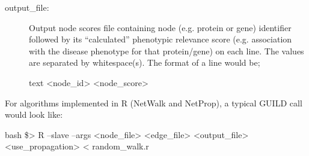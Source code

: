 \documentclass[11pt,twoside]{article}
\newcommand{\printcommand}[1]{\colorbox{code}{\scriptsize{\BUseVerbatim{#1}}}}
\begin{document}
\begin{description}
    \item[output\_file:] Output node scores file containing node (e.g. protein 
	or gene) identifier followed by its ``calculated'' phenotypic 
	relevance score (e.g. association with the disease phenotype for that 
	protein/gene) on each line. The values are separated by whitespace(s). 
	The format of a line would be;
\begin{SaveVerbatim}{text}
<node_id> <node_score>
\end{SaveVerbatim}
\printcommand{text}

\end{description}

For algorithms implemented in R (NetWalk and NetProp), a typical GUILD call would look like:

\begin{SaveVerbatim}{bash}
\$> R --slave --args <node_file> <edge_file> <output_file> <use_propagation> < random_walk.r
\end{SaveVerbatim}
\printcommand{bash}
\end{document}
